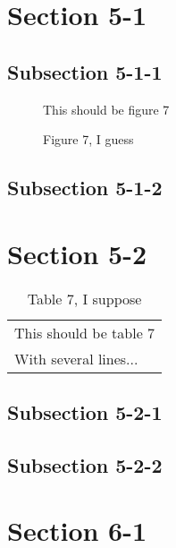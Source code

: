 \documentclass[10pt]{article}
\begin{document}
\appendix


\section{Section 5-1}
\label{sec:section-5-1}
\secttoc
\sectlot
\sectlof


\subsection{Subsection 5-1-1}
\label{sec:subsection-5-1-1}

\begin{figure}
  \centering
  This should be figure 7
  \caption{Figure 7, I guess}
  \label{fig:figure-7}
\end{figure}



\subsection{Subsection 5-1-2}
\label{sec:subsection-5-1-2}

\section{Section 5-2}
\label{sec:section-5-2}
\secttoc
\sectlot
\sectlof


\begin{table}
  \centering
  \begin{tabular}{l}
    This should be table 7\\
    With several lines...
  \end{tabular}
  \caption{Table 7, I suppose}
  \label{tab:table-7}
\end{table}

\subsection{Subsection 5-2-1}
\label{sec:subsection-5-2-1}

\subsection{Subsection 5-2-2}
\label{sec:subsection-5-2-2}



\section{Section 6-1}
\label{sec:section-6-1}
\secttoc
\sectlot
\sectlof
\end{document}
